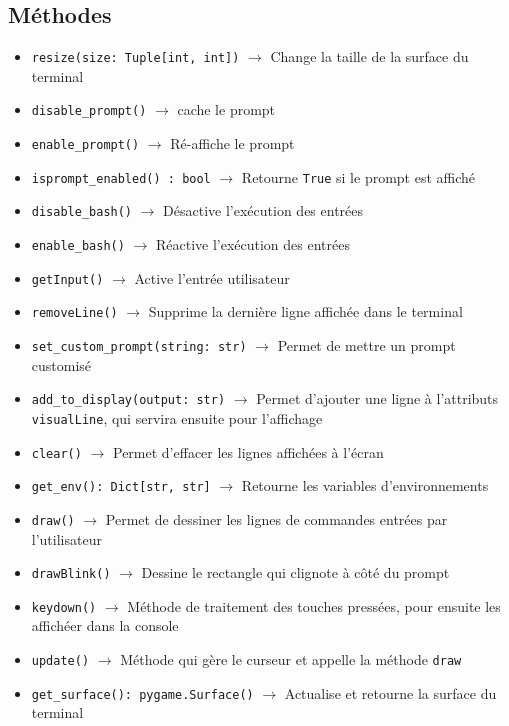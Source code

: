 \documentclass{report}
\begin{document}
\subsection*{Méthodes}
\begin{itemize}
  \item \texttt{resize(size: Tuple[int, int])}		$\rightarrow$ Change la taille de la surface du terminal
  \item \texttt{disable_prompt()}		$\rightarrow$  cache le prompt
  \item \texttt{enable_prompt()}		$\rightarrow$ Ré-affiche le prompt
  \item \texttt{isprompt_enabled() : bool}		$\rightarrow$ Retourne \texttt{True} si le prompt est affiché
  \item \texttt{disable_bash()}		$\rightarrow$ Désactive l'exécution des entrées
  \item \texttt{enable_bash()}		$\rightarrow$ Réactive l'exécution des entrées
  \item \texttt{getInput()}		$\rightarrow$ Active l’entrée utilisateur
  \item \texttt{removeLine()}		$\rightarrow$ Supprime la dernière ligne affichée dans le terminal
  \item \texttt{set_custom_prompt(string: str)}		$\rightarrow$ Permet de mettre un prompt customisé
  \item \texttt{add_to_display(output: str)}		$\rightarrow$ Permet d’ajouter une ligne à l’attributs \texttt{visualLine}, qui servira ensuite pour l’affichage
  \item \texttt{clear()} $\rightarrow$ Permet d’effacer les lignes affichées à l’écran
  \item \texttt{get_env(): Dict[str, str]}		$\rightarrow$ Retourne les variables d'environnements
  \item \texttt{draw()}	$\rightarrow$ Permet de dessiner les lignes de commandes entrées par l’utilisateur
  \item \texttt{drawBlink()}		$\rightarrow$ Dessine le rectangle qui clignote à côté du prompt
  \item \texttt{keydown()}		$\rightarrow$ Méthode de traitement des touches pressées, pour ensuite les affichéer dans la console
  \item \texttt{update()}		$\rightarrow$  Méthode qui gère le curseur et appelle la méthode \texttt{draw}
  \item \texttt{get_surface(): pygame.Surface()}		$\rightarrow$ Actualise et retourne la surface du terminal
\end{itemize}
\newpage
\end{document}
